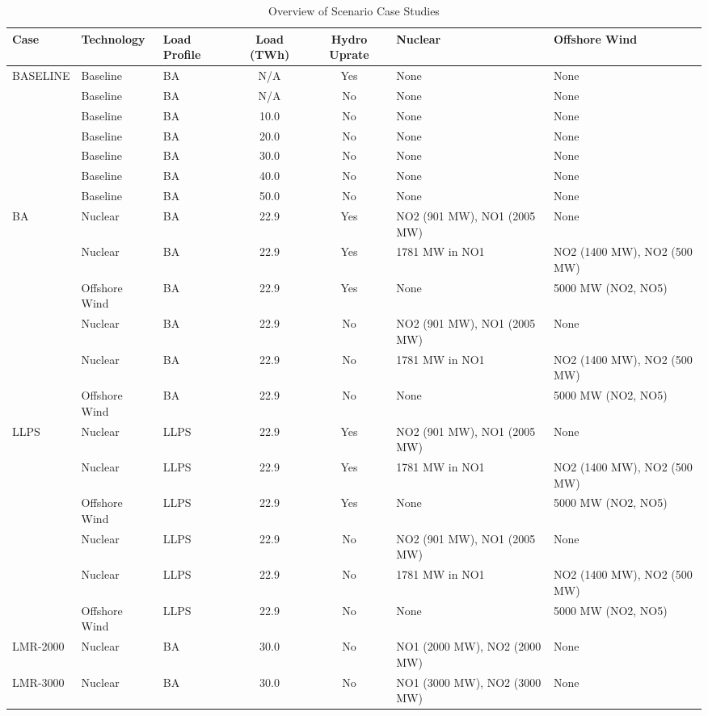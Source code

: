\begin{table}[htbp]
\centering
\caption{Overview of Scenario Case Studies}
\label{tab:scenario_overview}
\small
\begin{tabular}{lllccll}
\hline
\textbf{Case} & \textbf{Technology} & \textbf{Load Profile} & \textbf{Load (TWh)} & \textbf{Hydro Uprate} & \textbf{Nuclear} & \textbf{Offshore Wind} \\
\hline
BASELINE & Baseline & BA & N/A & Yes & None & None \\
 & Baseline & BA & N/A & No & None & None \\
 & Baseline & BA & 10.0 & No & None & None \\
 & Baseline & BA & 20.0 & No & None & None \\
 & Baseline & BA & 30.0 & No & None & None \\
 & Baseline & BA & 40.0 & No & None & None \\
 & Baseline & BA & 50.0 & No & None & None \\
\hline
BA & Nuclear & BA & 22.9 & Yes & NO2 (901 MW), NO1 (2005 MW) & None \\
 & Nuclear & BA & 22.9 & Yes & 1781 MW in NO1 & NO2 (1400 MW), NO2 (500 MW) \\
 & Offshore Wind & BA & 22.9 & Yes & None & 5000 MW (NO2, NO5) \\
 & Nuclear & BA & 22.9 & No & NO2 (901 MW), NO1 (2005 MW) & None \\
 & Nuclear & BA & 22.9 & No & 1781 MW in NO1 & NO2 (1400 MW), NO2 (500 MW) \\
 & Offshore Wind & BA & 22.9 & No & None & 5000 MW (NO2, NO5) \\
\hline
LLPS & Nuclear & LLPS & 22.9 & Yes & NO2 (901 MW), NO1 (2005 MW) & None \\
 & Nuclear & LLPS & 22.9 & Yes & 1781 MW in NO1 & NO2 (1400 MW), NO2 (500 MW) \\
 & Offshore Wind & LLPS & 22.9 & Yes & None & 5000 MW (NO2, NO5) \\
 & Nuclear & LLPS & 22.9 & No & NO2 (901 MW), NO1 (2005 MW) & None \\
 & Nuclear & LLPS & 22.9 & No & 1781 MW in NO1 & NO2 (1400 MW), NO2 (500 MW) \\
 & Offshore Wind & LLPS & 22.9 & No & None & 5000 MW (NO2, NO5) \\
\hline
LMR-2000 & Nuclear & BA & 30.0 & No & NO1 (2000 MW), NO2 (2000 MW) & None \\
\hline
LMR-3000 & Nuclear & BA & 30.0 & No & NO1 (3000 MW), NO2 (3000 MW) & None \\

\end{tabular}
\end{table}
